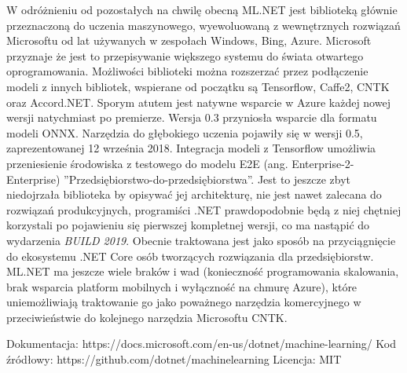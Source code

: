 \documentclass[12pt,a4paper,twoside,titlepage,openright]{book}
\begin{document}
W odróżnieniu od pozostałych na chwilę obecną ML.NET jest biblioteką głównie przeznaczoną do uczenia maszynowego, wyewoluowaną z wewnętrznych rozwiązań Microsoftu od lat używanych w zespołach Windows, Bing, Azure. Microsoft przyznaje że jest to przepisywanie większego systemu do świata otwartego oprogramowania. \cite{siteMLNet} Możliwości biblioteki można rozszerzać przez podłączenie modeli z innych bibliotek, wspierane od początku są Tensorflow, Caffe2, CNTK oraz Accord.NET. Sporym atutem jest natywne wsparcie w Azure każdej nowej wersji natychmiast po premierze. Wersja 0.3 przyniosła wsparcie dla formatu modeli ONNX. Narzędzia do głębokiego uczenia pojawiły się w wersji 0.5, zaprezentowanej 12 września 2018. Integracja modeli z Tensorflow umożliwia przeniesienie środowiska z testowego do modelu E2E (ang. Enterprise-2-Enterprise) ''Przedsiębiorstwo-do-przedsiębiorstwa''. Jest to jeszcze zbyt niedojrzała biblioteka by opisywać jej architekturę, nie jest nawet zalecana do rozwiązań produkcyjnych, programiści .NET prawdopodobnie będą z niej chętniej korzystali po pojawieniu się pierwszej kompletnej wersji, co ma nastąpić do wydarzenia \textit{BUILD 2019}. Obecnie traktowana jest jako sposób na przyciągnięcie do ekosystemu .NET Core osób tworzących rozwiązania dla przedsiębiorstw. ML.NET ma jeszcze wiele braków i wad (konieczność programowania skalowania, brak wsparcia platform mobilnych i wyłączność na chmurę Azure), które uniemożliwiają traktowanie go jako poważnego narzędzia komercyjnego w przeciwieństwie do kolejnego narzędzia Microsoftu CNTK.

\noindent
\newline
Dokumentacja: https://docs.microsoft.com/en-us/dotnet/machine-learning/
\newline
Kod źródłowy: https://github.com/dotnet/machinelearning
\newline
Licencja: MIT
\end{document}
